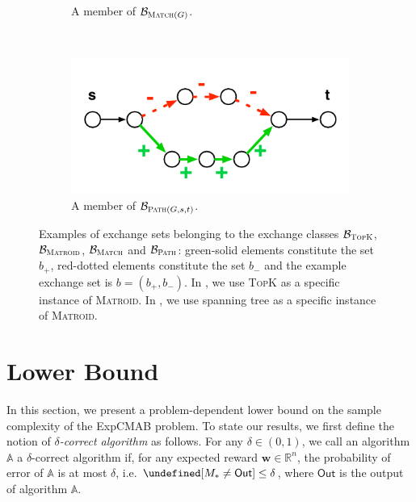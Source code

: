 \documentclass{article}
\newcommand{\Problem}{{\small \textsf{ExpCMAB}}\xspace}
\newcommand{\M}{\mathcal M}
\newcommand{\B}{\mathcal B}
\newcommand{\RR}{\mathbb R}
\newcommand{\out}{\mathsf{Out}}
\let\Pr\undefined
\DeclareMathOperator{\Pr}{Pr}
\newcommand{\MultiIdent}{\textsc{TopK}\xspace}
\newcommand{\Matroid}{\textsc{Matroid}\xspace}
\newcommand{\Match}{\textsc{Match}\xspace}
\newcommand{\Path}{\textsc{Path}\xspace}
\renewcommand{\vec}[1]{\boldsymbol{#1}}
\begin{document}
{\begin{figure}[tb]
\begin{subfigure}[c]{0.22\textwidth}
	\caption{A member of $\B_{\Match(G)}$.}
\end{subfigure}
~
\begin{subfigure}[c]{0.22\textwidth}
	\includegraphics[width=\textwidth]{fig/exchange-path}
	\caption{A member of $\B_{\Path(G,s,t)}$.}
\end{subfigure}
\caption{
Examples of exchange sets belonging to the exchange classes $\B_{\MultiIdent}$, $\B_{\Matroid}$, $\B_{\Match}$ and $\B_{\Path}$:
green-solid elements constitute the set $b_+$, red-dotted elements constitute the set $b_-$ and the example exchange set is $b=(b_+,b_-)$. 
In , we use \MultiIdent as a specific instance of \Matroid.
In , we use spanning tree as a specific instance of \Matroid.
}
\label{fig:exchange}
\end{figure}
}







\section{Lower Bound}
In this section, we present a problem-dependent lower bound on the sample complexity of the \Problem problem. 
To state our results, we first define the notion of \emph{$\delta$-correct algorithm} as follows.
For any $\delta \in (0,1)$, we call an algorithm $\mathbb A$ a $\delta$-correct algorithm if, for any expected reward $\vec w \in \RR^{n}$, the probability of error of $\mathbb A$ is at most $\delta$, i.e. $\Pr[M_*\not =\out] \le \delta$, where $\out$ is the output of algorithm $\mathbb A$.
\end{document}
